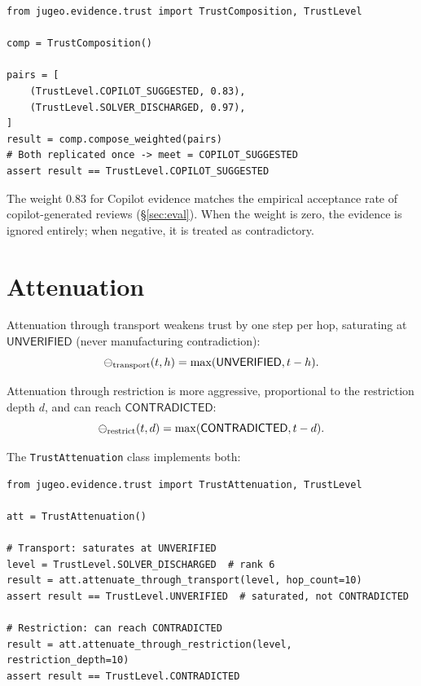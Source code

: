 \documentclass[11pt]{article}
\newcommand{\Unver}{\mathsf{UNVERIFIED}}
\newcommand{\Contra}{\mathsf{CONTRADICTED}}
\begin{document}
\begin{lstlisting}[style=jugeo-python]
from jugeo.evidence.trust import TrustComposition, TrustLevel

comp = TrustComposition()

pairs = [
    (TrustLevel.COPILOT_SUGGESTED, 0.83),
    (TrustLevel.SOLVER_DISCHARGED, 0.97),
]
result = comp.compose_weighted(pairs)
# Both replicated once -> meet = COPILOT_SUGGESTED
assert result == TrustLevel.COPILOT_SUGGESTED
\end{lstlisting}

\begin{remark}
The weight $0.83$ for Copilot evidence matches the empirical acceptance rate
of copilot-generated reviews (§\ref{sec:eval}).  When the weight is zero, the
evidence is ignored entirely; when negative, it is treated as contradictory.
\end{remark}

\section{Attenuation}\label{sec:atten}

\begin{definition}\label{def:transport-atten}
Attenuation through transport weakens trust by one step per hop, saturating at
$\Unver$ (never manufacturing contradiction):
\[
  \tatten_{\mathrm{transport}}(t, h) = \max(\Unver, t - h).
\]
\end{definition}

\begin{definition}\label{def:restriction-atten}
Attenuation through restriction is more aggressive, proportional to the
restriction depth $d$, and can reach $\Contra$:
\[
  \tatten_{\mathrm{restrict}}(t, d) = \max(\Contra, t - d).
\]
\end{definition}

The \texttt{TrustAttenuation} class implements both:

\begin{lstlisting}[style=jugeo-python]
from jugeo.evidence.trust import TrustAttenuation, TrustLevel

att = TrustAttenuation()

# Transport: saturates at UNVERIFIED
level = TrustLevel.SOLVER_DISCHARGED  # rank 6
result = att.attenuate_through_transport(level, hop_count=10)
assert result == TrustLevel.UNVERIFIED  # saturated, not CONTRADICTED

# Restriction: can reach CONTRADICTED
result = att.attenuate_through_restriction(level, restriction_depth=10)
assert result == TrustLevel.CONTRADICTED
\end{lstlisting}
\end{document}
